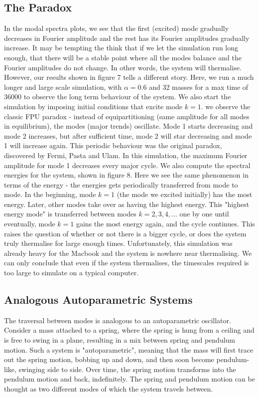 \documentclass{article}
\begin{document}
\subsection{The Paradox}
In the modal spectra plots, we see that the first (excited) mode gradually decreases
in Fourier amplitude and the rest has its Fourier amplitudes gradually increase.
It may be tempting the think that if we let the simulation run long enough,
 that there will 
be a stable point where all the modes balance and the Fourier amplitudes do not change. In other words, 
the system will thermalise. However, our results shown in figure 7 tells a different story. Here, 
we run a much longer and large scale simulation, with $\alpha=0.6$ and 32 masses for a max time of 
36000 to observe the long term behaviour of the system. 
We also start the simulation by imposing initial conditions that excite mode $k=1$. 
 we observe the classic FPU paradox - 
instead of equipartitioning (same amplitude for all modes in equilibrium), 
the modes (major trends) oscillate. Mode 1 starts decreasing and 
mode 2 increases, but after sufficient time, mode 2 will star
 decreasing and mode 1 will increase again. 
This periodic behaviour was the original paradox, discovered by Fermi, Pasta and Ulam. 
In this simulation, the maximum Fourier amplitude for mode 1 decreases every major cycle.
We also compute the 
spectral energies for the system, shown in figure 8. Here we see the same phenomenon 
in terms of the energy - the energies gets 
periodically transferred from mode to mode. In the beginning,
 mode $k=1$ (the mode we excited initially) has the most energy. Later, 
other modes take over as having the highest energy. This "highest energy mode" is transferred 
between modes $k=2,3,4,...$ one by one until eventually, mode $k=1$ 
gains the most energy again, and the cycle continues. 
This raises the question of whether or not there is a bigger cycle, or does 
the system truly thermalise for large enough times. 
Unfortunately, this simulation was already heavy for the Macbook and the system is 
nowhere near thermalising. We can only conclude that even if the system thermalises,
the timescales required is too large to simulate on a typical computer. 

\subsection{Analogous Autoparametric Systems}
The traversal between modes is analogous to an autoparametric oscillator. 
Consider a mass attached to a spring, where the spring is hung from a ceiling and 
is free to swing in a plane, resulting in a mix between spring and pendulum motion. 
Such a system is "autoparametric", meaning that the mass will first trace out 
the spring motion, bobbing up and down, and then soon become pendulum-like,
 swinging side to side. Over time, the 
spring motion transforms into the pendulum motion and back, 
indefinitely.
The spring and pendulum motion can be 
thought as two different modes of which the system travels between.
\end{document}
